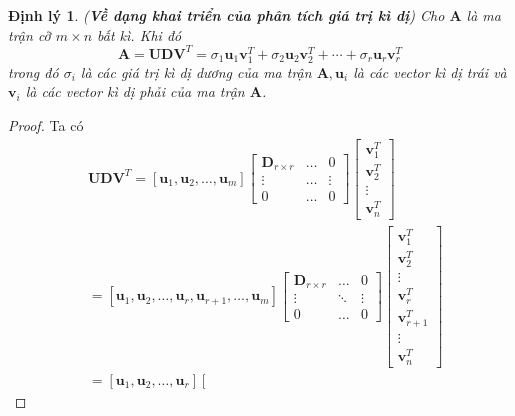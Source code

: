 \documentclass[12pt,a4paper,oneside]{report}
\newtheorem{dl}{Định lý}[section]
\numberwithin{equation}{section}
\begin{document}
\begin{dl} \cite{linh2016} (\textbf{Về dạng khai triển của phân tích giá trị kì dị}) Cho $\mathbf{A}$ là ma trận cỡ $m \times n$ bất kì. Khi đó
\begin{equation} \label{eq_4}
\mathbf{A}=\mathbf{U D V}^{T}=\sigma_{1} \mathbf{u}_{1} \mathbf{v}_{1}^{T}+\sigma_{2} \mathbf{u}_{2} \mathbf{v}_{2}^{T}+\cdots+\sigma_{r} \mathbf{u}_{r} \mathbf{v}_{r}^{T}
\end{equation}
trong đó $\sigma_{i}$ là các giá trị kì dị dương của ma trận $\mathbf{A}, \mathbf{u}_{i}$ là các vector kì dị trái và $\mathbf{v}_{i}$ là các vector kì dị phải của ma trận $\mathbf{A}$.
\end{dl}
\begin{proof}
Ta có
$$
\begin{aligned}
	& \mathbf{U D V}^{T}=\left[\mathbf{u}_{1}, \mathbf{u}_{2}, \ldots, \mathbf{u}_{m}\right]\left[\begin{array}{ccc}
		\mathbf{D}_{r \times r} & \ldots & 0 \\
		\vdots & \ldots & \vdots \\
		0 & \ldots & 0
	\end{array}\right]\left[\begin{array}{c}
		\mathbf{v}_{1}^{T} \\
		\mathbf{v}_{2}^{T} \\
		\vdots \\
		\mathbf{v}_{n}^{T}
	\end{array}\right]\\
	& =\left[\mathbf{u}_{1}, \mathbf{u}_{2}, \ldots, \mathbf{u}_{r}, \mathbf{u}_{r+1}, \ldots, \mathbf{u}_{m}\right]\left[\begin{array}{ccc}
		\mathbf{D}_{r \times r} & \ldots & 0 \\
		\vdots & \ddots & \vdots \\
		0 & \ldots & 0
	\end{array}\right]\left[\begin{array}{c}
		\mathbf{v}_{1}^{T} \\
		\mathbf{v}_{2}^{T} \\
		\vdots \\
		\mathbf{v}_{r}^{T} \\
		\mathbf{v}_{r+1}^{T} \\
		\vdots \\
		\mathbf{v}_{n}^{T}
	\end{array}\right] \\
	& \left.=\left[\mathbf{u}_{1}, \mathbf{u}_{2}, \ldots, \mathbf{u}_{r}\right]\left[\begin{array}{ccc}

\end{array}
\end{aligned}$$
\end{proof}
\end{document}
